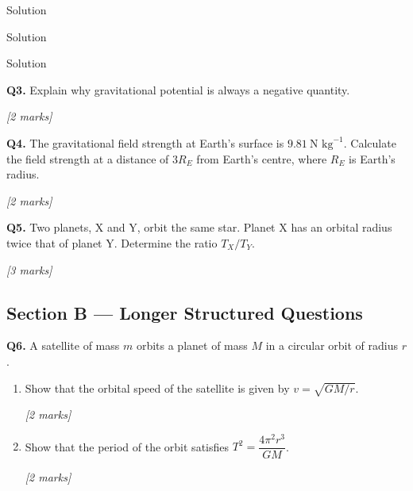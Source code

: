 \documentclass[12pt,a4paper]{article}
\begin{document}
\begin{examplebox}{Solution}
\begin{examplebox}{Solution}
\begin{examplebox}{Solution}
\begin{tcolorbox}[colback=white, colframe=midblue, breakable]
\begin{minipage}{\linewidth}
\textbf{Q3.} Explain why gravitational potential is always a negative quantity.
\par\hfill\textit{[2 marks]}
\vspace{3cm}
\end{minipage}

\begin{minipage}{\linewidth}
\textbf{Q4.} The gravitational field strength at Earth's surface is $9.81\ \text{N kg}^{-1}$. Calculate the field strength at a distance of $3R_E$ from Earth's centre, where $R_E$ is Earth's radius.
\par\hfill\textit{[2 marks]}
\vspace{3cm}
\end{minipage}

\begin{minipage}{\linewidth}
\textbf{Q5.} Two planets, X and Y, orbit the same star. Planet X has an orbital radius twice that of planet Y. Determine the ratio $T_X / T_Y$.
\par\hfill\textit{[3 marks]}
\vspace{3.5cm}
\end{minipage}

\end{tcolorbox}

\subsection*{Section B — Longer Structured Questions}

\begin{tcolorbox}[colback=white, colframe=midblue, breakable]

\begin{minipage}{\linewidth}
\textbf{Q6.} A satellite of mass $m$ orbits a planet of mass $M$ in a circular orbit of radius $r$.
\end{minipage}

\begin{enumerate}[label=(\alph*)]
  \item \begin{minipage}[t]{\linewidth}
  Show that the orbital speed of the satellite is given by $v = \sqrt{GM/r}$.
  \par\hfill\textit{[2 marks]}
  \vspace{3.5cm}
  \end{minipage}

  \item \begin{minipage}[t]{\linewidth}
  Show that the period of the orbit satisfies $T^2 = \dfrac{4\pi^2 r^3}{GM}$.
  \par\hfill\textit{[2 marks]}
  \vspace{3.5cm}
  \end{minipage}


\end{enumerate}
\end{tcolorbox}
\end{examplebox}
\end{examplebox}
\end{examplebox}
\end{document}
